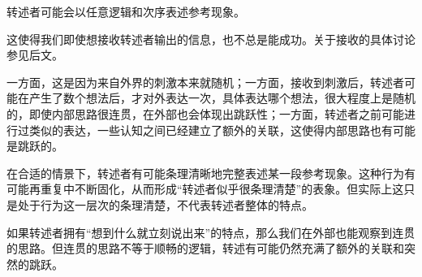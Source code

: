 转述者可能会以任意逻辑和次序表述参考现象。
\begin{explain}
这使得我们即使想接收转述者输出的信息，也不总是能成功。关于接收的具体讨论参见后文。

一方面，这是因为来自外界的刺激本来就随机；一方面，接收到刺激后，转述者可能在产生了数个想法后，才对外表达一次，具体表达哪个想法，很大程度上是随机的，即使内部思路很连贯，在外部也会体现出跳跃性；一方面，转述者之前可能进行过类似的表达，一些认知之间已经建立了额外的关联，这使得内部思路也有可能是跳跃的。

在合适的情景下，转述者有可能条理清晰地完整表述某一段参考现象。这种行为有可能再重复中不断固化，从而形成“转述者似乎很条理清楚”的表象。但实际上这只是处于行为这一层次的条理清楚，不代表转述者整体的特点。

如果转述者拥有“想到什么就立刻说出来”的特点，那么我们在外部也能观察到连贯的思路。但连贯的思路不等于顺畅的逻辑，转述有可能仍然充满了额外的关联和突然的跳跃。
\end{explain}

